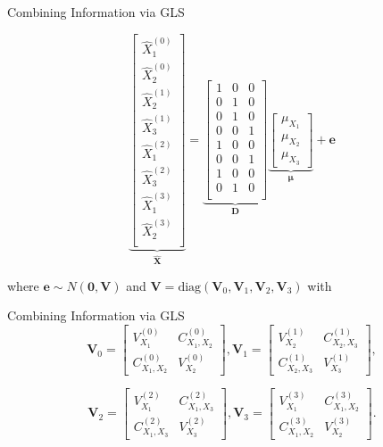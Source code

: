 \documentclass{beamer} %
\renewcommand{\bf}[1]{\mathbf{#1}}
\begin{document}
\begin{frame}{Combining Information via GLS}

  $$
  \underbrace{\begin{bmatrix}
    \hat X_1^{(0)} \\
    \hat X_2^{(0)} \\
    \hat X_2^{(1)} \\
    \hat X_3^{(1)} \\
    \hat X_1^{(2)} \\
    \hat X_3^{(2)} \\
    \hat X_1^{(3)} \\
    \hat X_2^{(3)} \\
  \end{bmatrix}}_{\hat{\bf X}} =
  \underbrace{\begin{bmatrix}
    1 & 0 & 0 \\
    0 & 1 & 0 \\
    0 & 1 & 0 \\
    0 & 0 & 1 \\
    1 & 0 & 0 \\
    0 & 0 & 1 \\
    1 & 0 & 0 \\
    0 & 1 & 0 \\
  \end{bmatrix}}_{\bf D}
  \underbrace{\begin{bmatrix}
    \mu_{X_1} \\ \mu_{X_2} \\ \mu_{X_3}
  \end{bmatrix}}_{\bm \mu} + 
  \bf e
  $$

  where $\bf e \sim N(\bf 0, \bf V)$ and 
  $\bf V = \text{diag}(\bf V_0, \bf V_1, \bf V_2, \bf V_3)$ with

\end{frame}

\begin{frame}{Combining Information via GLS}
  $$ 
  \bf V_0 = 
  \begin{bmatrix}
    V_{X_1}^{(0)} & C_{X_1, X_2}^{(0)} \\
    C_{X_1, X_2}^{(0)} & V_{X_2}^{(0)}
  \end{bmatrix},
  \bf V_1 = 
  \begin{bmatrix}
    V_{X_2}^{(1)} & C_{X_2, X_3}^{(1)} \\
    C_{X_2, X_3}^{(1)} & V_{X_3}^{(1)}
  \end{bmatrix},
  $$

  $$
  \bf V_2 = 
  \begin{bmatrix}
    V_{X_1}^{(2)} & C_{X_1, X_3}^{(2)} \\
    C_{X_1, X_3}^{(2)} & V_{X_3}^{(2)}
  \end{bmatrix},
  \bf V_3 = 
  \begin{bmatrix}
    V_{X_1}^{(3)} & C_{X_1, X_2}^{(3)} \\
    C_{X_1, X_2}^{(3)} & V_{X_2}^{(3)}
  \end{bmatrix}.
  $$

\end{frame}
\end{document}

